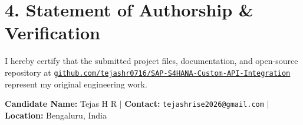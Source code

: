 \documentclass[11pt,a4paper]{article}
\begin{document}
\section{4. Statement of Authorship \& Verification}
I hereby certify that the submitted project files, documentation, and open-source repository at \href{https://github.com/tejashr0716/SAP-S4HANA-Custom-API-Integration}{\texttt{github.com/tejashr0716/SAP-S4HANA-Custom-API-Integration}} represent my original engineering work.

\vspace{10pt}
\textbf{Candidate Name:} Tejas H R \quad $|$ \quad \textbf{Contact:} \texttt{tejashrise2026@gmail.com} \quad $|$ \quad \textbf{Location:} Bengaluru, India
\end{document}
